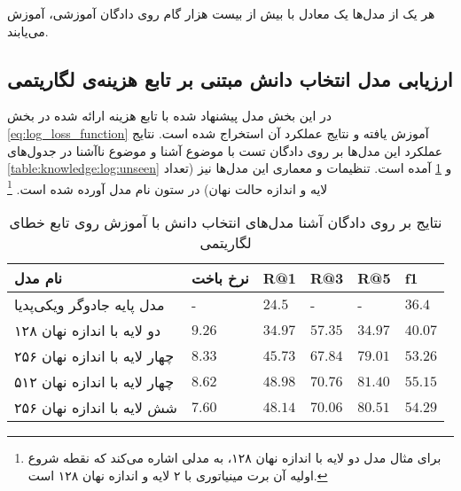 هر یک از مدل‌ها یک 
معادل با بیش از بیست هزار گام روی دادگان آموزشی، آموزش می‌یابند.

\subsection{ارزیابی مدل انتخاب دانش مبتنی بر تابع هزینه‌ی لگاریتمی }
\label{chap5:log_eval}
در این بخش مدل‌ پیشنهاد شده با تابع هزینه ارائه شده در بخش 
\ref{eq:log_loss_function}
آموزش یافته و نتایج عملکرد آن استخراج شده است. نتایج عملکرد این مدل‌ها بر روی دادگان تست با موضوع آشنا و موضوع ناآشنا در جدول‌های 
\ref{table:knowledge:log:unseen}
و 
\ref{table:knowledge:log:seen}
آمده است. تنظیمات و معماری این مدل‌ها نیز (تعداد لایه و اندازه حالت نهان) در ستون نام مدل آورده شده است.
\footnote{برای مثال مدل دو لایه با اندازه نهان ۱۲۸، به مدلی اشاره می‌کند که نقطه شروع اولیه آن برت مینیاتوری با ۲ لایه و اندازه نهان ۱۲۸ است.}

\begin{table}[h]
	\caption{نتایج بر روی دادگان آشنا مدل‌های انتخاب دانش با آموزش روی تابع خطای لگاریتمی }
	\centering
	\label{table:knowledge:log:seen}
	\begin{tabular}{|l|l|l|l|l|l|}
		\hline
		نام مدل                      & نرخ باخت        & R@1              & R@3              & R@5              & f1               \\ \hline
		مدل پایه جادوگر ویکی‌پدیا    & -               & $24.5$           & -                & -                & $36.4$           \\ \hline
		دو لایه با اندازه نهان ۱۲۸   & $9.26$          & $34.97$          & $57.35$          & $34.97$          & $40.07$          \\ \hline
		چهار لایه با اندازه نهان ۲۵۶ & $8.33$          & $45.73$          & $67.84$          & $79.01$          & $53.26$          \\ \hline
		چهار لایه با اندازه نهان ۵۱۲ & $8.62$          & $\mathbf{48.98}$ & $\mathbf{70.76}$ & $\mathbf{81.40}$ & $\mathbf{55.15}$ \\ \hline
		شش لایه با اندازه نهان ۲۵۶   & $\mathbf{7.60}$ & $48.14$          & $70.06$          & $80.51$          & $54.29$          \\ \hline
	\end{tabular}
\end{table}

